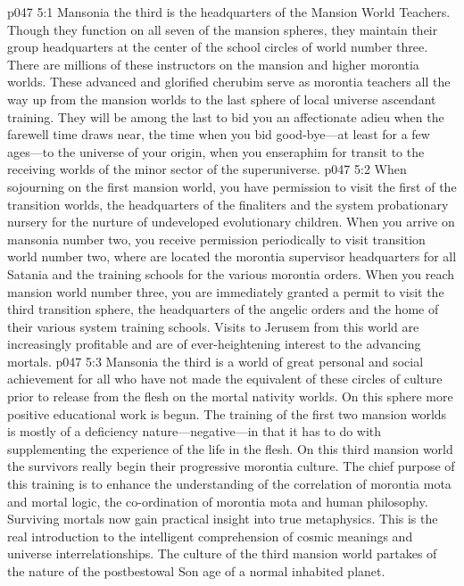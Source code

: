 \vs p047 5:1 Mansonia the third is the headquarters of the Mansion World Teachers. Though they function on all seven of the mansion spheres, they maintain their group headquarters at the center of the school circles of world number three. There are millions of these instructors on the mansion and higher morontia worlds. These advanced and glorified cherubim serve as morontia teachers all the way up from the mansion worlds to the last sphere of local universe ascendant training. They will be among the last to bid you an affectionate adieu when the farewell time draws near, the time when you bid good\hyp{}bye---at least for a few ages---to the universe of your origin, when you enseraphim for transit to the receiving worlds of the minor sector of the superuniverse.
\vs p047 5:2 When sojourning on the first mansion world, you have permission to visit the first of the transition worlds, the headquarters of the finaliters and the system probationary nursery for the nurture of undeveloped evolutionary children. When you arrive on mansonia number two, you receive permission periodically to visit transition world number two, where are located the morontia supervisor headquarters for all Satania and the training schools for the various morontia orders. When you reach mansion world number three, you are immediately granted a permit to visit the third transition sphere, the headquarters of the angelic orders and the home of their various system training schools. Visits to Jerusem from this world are increasingly profitable and are of ever\hyp{}heightening interest to the advancing mortals.\plusone
\vs p047 5:3 Mansonia the third is a world of great personal and social achievement for all who have not made the equivalent of these circles of culture prior to release from the flesh on the mortal nativity worlds. On this sphere more positive educational work is begun. The training of the first two mansion worlds is mostly of a deficiency nature---negative---in that it has to do with supplementing the experience of the life in the flesh. On this third mansion world the survivors really begin their progressive morontia culture. The chief purpose of this training is to enhance the understanding of the correlation of morontia mota and mortal logic, the co\hyp{}ordination of morontia mota and human philosophy. Surviving mortals now gain practical insight into true metaphysics. This is the real introduction to the intelligent comprehension of cosmic meanings and universe interrelationships. The culture of the third mansion world partakes of the nature of the postbestowal Son age of a normal inhabited planet.
